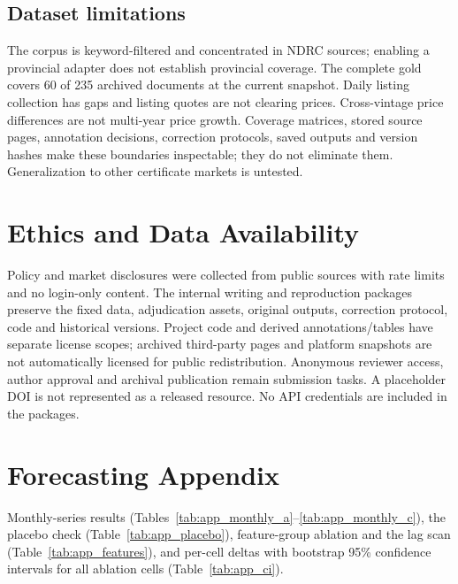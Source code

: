\documentclass[sigconf,anonymous,review]{acmart}
\begin{document}
\subsection{Dataset limitations}
The corpus is keyword-filtered and concentrated in NDRC sources; enabling a provincial adapter does not establish provincial coverage. The complete gold covers 60 of 235 archived documents at the current snapshot. Daily listing collection has gaps and listing quotes are not clearing prices. Cross-vintage price differences are not multi-year price growth. Coverage matrices, stored source pages, annotation decisions, correction protocols, saved outputs and version hashes make these boundaries inspectable; they do not eliminate them. Generalization to other certificate markets is untested.

\section{Ethics and Data Availability}
Policy and market disclosures were collected from public sources with rate limits and no login-only content. The internal writing and reproduction packages preserve the fixed data, adjudication assets, original outputs, correction protocol, code and historical versions. Project code and derived annotations/tables have separate license scopes; archived third-party pages and platform snapshots are not automatically licensed for public redistribution. Anonymous reviewer access, author approval and archival publication remain submission tasks. A placeholder DOI is not represented as a released resource. No API credentials are included in the packages.

\appendix
\section{Forecasting Appendix}
\label{app:forecast}
Monthly-series results (Tables~\ref{tab:app_monthly_a}--\ref{tab:app_monthly_c}), the placebo check (Table~\ref{tab:app_placebo}), feature-group ablation and the lag scan (Table~\ref{tab:app_features}), and per-cell deltas with bootstrap 95\% confidence intervals for all ablation cells (Table~\ref{tab:app_ci}).







\end{document}
